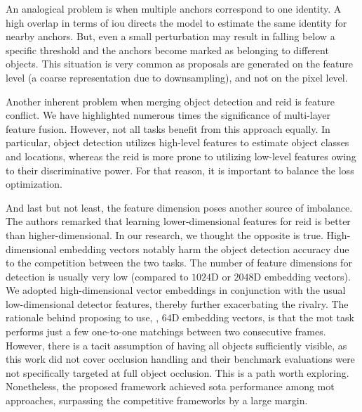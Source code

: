 An analogical problem is when multiple anchors correspond to one identity. A high overlap in terms of \gls{iou} directs the model to estimate the same identity for nearby anchors. But, even a small perturbation may result in falling below a specific threshold and the anchors become marked as belonging to different objects. This situation is very common as proposals are generated on the feature level (a coarse representation due to downsampling), and not on the pixel level.

Another inherent problem when merging object detection and \gls{reid} is feature conflict. We have highlighted numerous times the significance of multi-layer feature fusion. However, not all tasks benefit from this approach equally. In particular, object detection utilizes high-level features to estimate object classes and locations, whereas the \gls{reid} is more prone to utilizing low-level features owing to their discriminative power. For that reason, it is important to balance the loss optimization.

And last but not least, the feature dimension poses another source of imbalance. The authors remarked that learning lower-dimensional features for \gls{reid} is better than higher-dimensional. In our research, we thought the opposite is true. High-dimensional embedding vectors notably harm the object detection accuracy due to the competition between the two tasks. The number of feature dimensions for detection is usually very low (compared to $1024$D or $2048$D embedding vectors). We adopted high-dimensional vector embeddings in conjunction with the usual low-dimensional detector features, thereby further exacerbating the rivalry. The rationale behind proposing to use, \egtext{}, $64$D embedding vectors, is that the \gls{mot} task performs just a few one-to-one matchings between two consecutive frames. However, there is a tacit assumption of having all objects sufficiently visible, as this work did not cover occlusion handling and their benchmark evaluations were not specifically targeted at full object occlusion. This is a path worth exploring. Nonetheless, the proposed framework achieved \gls{sota} performance among \gls{mot} approaches, surpassing the competitive frameworks by a large margin.
